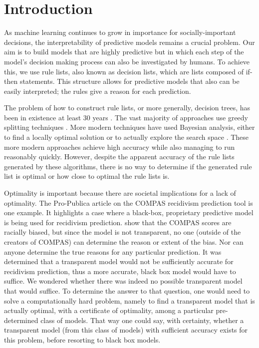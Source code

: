 \documentclass[aoas,preprint]{imsart}
\begin{document}
\section{Introduction}

As machine learning continues to grow in importance for socially-important decisions, the interpretability of predictive models remains a crucial problem. Our aim is to build models that are highly predictive but in which each step of the model's decision making process can also be investigated by humans. To achieve this, we use rule lists, also known as decision lists, which are lists composed of if-then statements. This structure allows for predictive models that also can be easily interpreted; the rules give a reason for each prediction.

The problem of how to construct rule lists, or more generally, decision trees, has been in existence at least 30 years \cite{rivest:1987,CART,C5.0}. The vast majority of approaches use greedy splitting techniques \cite{rivest:1987,CART,C5.0,etc}. More modern techniques have used Bayesian analysis, either to find a locally optimal solution \cite{BART} or to actually explore the search space \citep{LethamRuMcMa15, YangRuSe16}. These more modern approaches achieve high accuracy while also managing to run reasonably quickly. However, despite the apparent accuracy of the rule lists generated by these algorithms, there is no way to determine if the generated rule list is optimal or how close to optimal the rule lists is.

Optimality is important because there are societal implications for a lack of optimality. The Pro-Publica article on the COMPAS recidivism prediction tool \citep{LarsonMaKiAn16} is one example. It highlights a case where a black-box, proprietary predictive model is being used for recidivism prediction. \citep{LarsonMaKiAn16}  show that the COMPAS scores are racially biased, but since the model is not transparent, no one (outside of the creators of COMPAS) can determine the reason or extent of the bias. Nor can anyone determine the true reasons for any particular prediction. It was determined that a transparent model would not be sufficiently accurate for recidivism prediction, thus a more accurate, black box model would have to suffice. We wondered whether there was indeed no possible transparent model that would suffice. To determine the answer to that question, one would need to solve a computationally hard problem, namely to find a transparent model that is actually optimal, with a certificate of optimality, among a particular pre-determined class of models. That way one could say, with certainty, whether a transparent model (from this class of models) with sufficient accuracy exists for this problem, before resorting to black box models.
\end{document}
